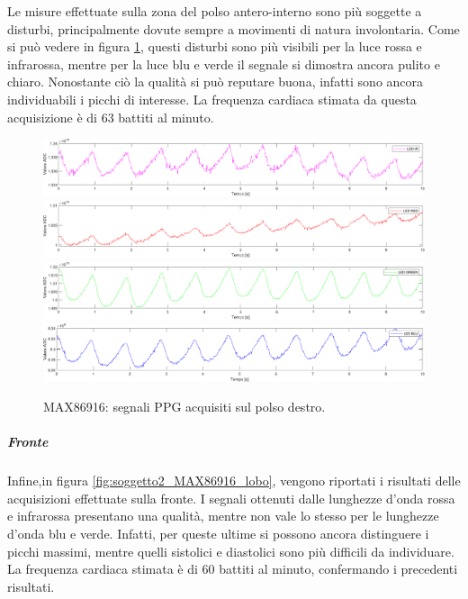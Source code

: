 Le misure effettuate sulla zona del polso antero-interno sono più soggette a disturbi, principalmente dovute sempre a movimenti di natura involontaria. Come si può vedere in figura \ref{fig:soggetto2_MAX86916_polso}, questi disturbi sono più visibili per la luce rossa e infrarossa, mentre per la luce blu e verde il segnale si dimostra ancora pulito e chiaro. Nonostante ciò la qualità si può reputare buona, infatti sono ancora individuabili i picchi di interesse. La frequenza cardiaca stimata da questa acquisizione è di 63 battiti al minuto.
\begin{figure}[h]
	\centering
	\includegraphics[width=1\linewidth]{ImageFiles/Misure Preliminari/Soggetto 2/max86916/polso_inferiore_ired}
	\includegraphics[width=1\linewidth]{ImageFiles/Misure Preliminari/Soggetto 2/max86916/polso_inferiore_red}
	\includegraphics[width=1\linewidth]{ImageFiles/Misure Preliminari/Soggetto 2/max86916/polso_inferiore_green}
	\includegraphics[width=1\linewidth]{ImageFiles/Misure Preliminari/Soggetto 2/max86916/polso_inferiore_blu}
	\caption{MAX86916: segnali PPG acquisiti sul polso destro.}
	\label{fig:soggetto2_MAX86916_polso}
\end{figure}

\subparagraph{Fronte}

Infine,in figura \ref{fig:soggetto2_MAX86916_lobo}, vengono riportati i risultati delle acquisizioni effettuate sulla fronte. I segnali ottenuti dalle lunghezze d'onda rossa e infrarossa presentano una qualità, mentre non vale lo stesso per le lunghezze d'onda blu e verde. Infatti, per queste ultime si possono ancora distinguere i picchi massimi, mentre quelli sistolici e diastolici sono più difficili da individuare. La frequenza cardiaca stimata è di 60 battiti al minuto, confermando i precedenti risultati.

